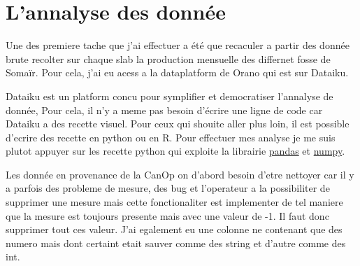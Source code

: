 \section{L'annalyse des donnée}
Une des premiere tache que j'ai effectuer a été que recaculer a partir des donnée brute recolter sur chaque slab la production mensuelle des differnet fosse de Somaïr. Pour cela, j'ai eu acess a la dataplatform de Orano qui est sur Dataiku. 

Dataiku est un platform concu pour symplifier et democratiser l'annalyse de donnée, Pour cela, il n'y a meme pas besoin d'écrire une ligne de code car Dataiku a des recette visuel. Pour ceux qui shouite aller plus loin, il est possible d'ecrire des recette en python ou en R. Pour effectuer mes analyse je me suis plutot appuyer sur les recette python qui exploite la librairie \href{https://pandas.pydata.org/}{pandas} et \href{https://numpy.org/}{numpy}.

Les donnée en provenance de la CanOp on d'abord besoin d'etre nettoyer car il y a parfois des probleme de mesure, des bug et l'operateur a la possibiliter de supprimer une mesure mais cette fonctionaliter est implementer de tel maniere que la mesure est toujours presente mais avec une valeur de -1. Il faut donc supprimer tout ces valeur. J'ai egalement eu une colonne ne contenant que des numero mais dont certaint etait sauver comme des string et d'autre comme des int.


